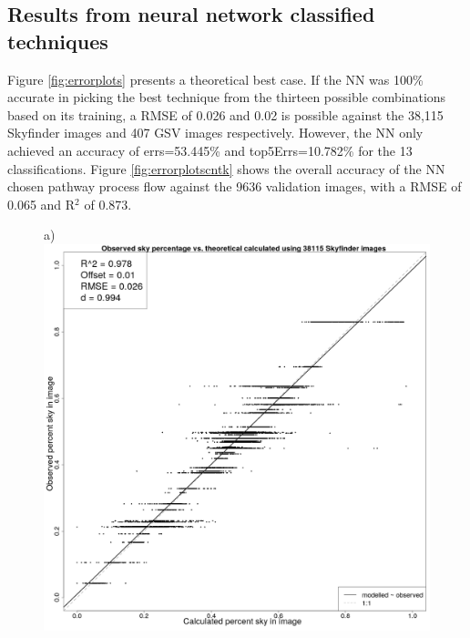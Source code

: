 \documentclass[final,3p,times,authoryear]{elsarticle}
\begin{document}
\subsection{Results from neural network classified techniques}\label{sec:resultsnn}
Figure \ref{fig:errorplots} presents a theoretical best case. If the NN was 100\% accurate in picking the best technique from the thirteen possible combinations based on its training, a RMSE of 0.026 and 0.02 is possible against the 38,115 Skyfinder images and 407 GSV images respectively. However, the NN only achieved an accuracy of errs=53.445\% and top5Errs=10.782\% for the 13 classifications. Figure \ref{fig:errorplotscntk} shows the overall accuracy of the NN chosen pathway process flow against the 9636 validation images, with a RMSE of 0.065 and R$^{2}$ of 0.873.

\begin{figure}
\centering
a)\includegraphics[scale=0.15]{Images/ErrorPlots.png}

\end{figure}
\end{document}

